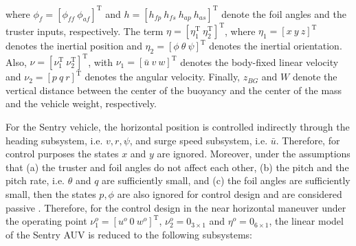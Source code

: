 \documentclass[12pt,draftcls,onecolumn]{IEEEtran}
\begin{document}
where 
$\phi_f=[\phi_{ff} \ \phi_{af}]^{\text{T}}$ and 
$h=[h_{fp}\ h_{fs}\ h_{ap}\ h_{as}]^\text{T}$ denote the foil angles and the truster inputs, respectively. 
The term 
$\eta=[\eta_1^\text{T} \ \eta_2^\text{T}]^\text{T}$, where $\eta_1=[x\ y\  z]^\text{T}$ denotes the inertial position and $\eta_2=[\phi \ \theta\ \psi]^\text{T}$ denotes the  inertial orientation. Also, $\nu=[\nu_1^\text{T}\ \nu_2^\text{T}]^\text{T}$, with $\nu_1=[\bar u \ v \ w]^\text{T}$ denotes the body-fixed linear velocity and $\nu_2=[p\ q \ r]^\text{T}$  denotes the angular velocity. Finally, $z_{BG}$ and $W$  denote the vertical distance between the center of the buoyancy and the center of the mass and the vehicle weight, respectively. 
\par
For the Sentry vehicle, the horizontal position is controlled indirectly through the heading subsystem, i.e. $v,r,\psi$, and surge speed subsystem, i.e. $\bar{u}$. Therefore, for control purposes the states $x$ and $y$ are ignored.  Moreover, 
under the assumptions that (a) the truster and foil angles do not affect each other, (b) the pitch and the pitch rate, i.e. $\theta$ and $q$ are sufficiently small, and (c) the foil angles are  sufficiently small, then the states $p,\phi$ are also ignored for control design and are considered passive \cite{jakuba2003}.  Therefore, 
 for the control design in the near horizontal maneuver under the operating point $\nu_1^o=[u^o\ 0\ w^o]^\text{T}$, $\nu_2^o=0_{3\times 1}$ and $\eta^o=0_{6\times 1}$,  the linear model of the Sentry AUV is reduced to the following subsystems: 
\end{document}
